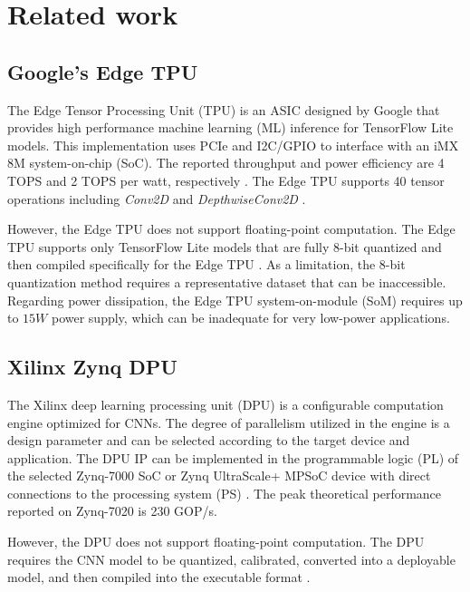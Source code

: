 \section{Related work}
\label{sec:related_work}
\subsection{Google's Edge TPU}

The Edge Tensor Processing Unit (TPU) is an ASIC designed by Google that provides high performance machine learning (ML) inference for TensorFlow Lite models\cite{yazdanbakhsh2021evaluation}. This implementation uses PCIe and I2C/GPIO to interface with an iMX 8M system-on-chip (SoC). The reported throughput and power efficiency are 4 TOPS and 2 TOPS per watt, respectively \cite{coral2021Datasheet}. The Edge TPU supports 40 tensor operations including \emph{Conv2D} and \emph{DepthwiseConv2D} \cite{coral2021Compatibility}.

However, the Edge TPU  does not support floating-point computation. The Edge TPU supports only TensorFlow Lite models that are fully 8-bit quantized and then compiled specifically for the Edge TPU \cite{cass2019taking}. As a limitation, the 8-bit quantization method requires a representative dataset that can be inaccessible.
Regarding power dissipation, the Edge TPU system-on-module (SoM) requires up to $15W$ power supply\cite{coral2021Datasheet}, which can be inadequate for very low-power applications.

\subsection{Xilinx Zynq DPU}
The Xilinx deep learning processing unit (DPU) is a configurable computation engine optimized for CNNs. The degree of parallelism utilized in the engine is a design parameter and can be selected according to the target device and application. The DPU IP can be implemented in the programmable logic (PL) of the selected Zynq-7000 SoC or Zynq UltraScale+ MPSoC device with direct connections to the processing system (PS) \cite{xilinxDPU}. The peak theoretical performance reported on Zynq-7020 is 230 GOP/s.

However, the DPU does not support floating-point computation. The DPU requires the CNN model to be quantized, calibrated, converted into a deployable model, and then compiled into the executable format \cite{xilinxDPU}.